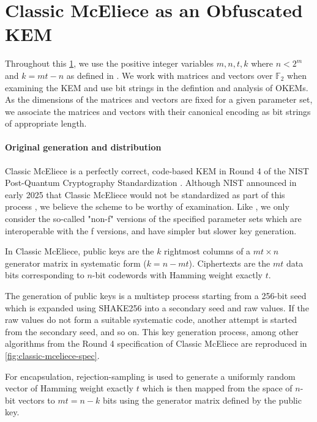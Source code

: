 \section{Classic McEliece as an Obfuscated KEM} \label{sec:obfuscating-classic-mceliece}

Throughout this \cref{sec:obfuscating-classic-mceliece}, we use the positive integer variables $m,n,t,k$ where $n < 2^m$ and $k=mt-n$ as defined in \cite{NISTPQC-R4:ClassicMcEliece22}. We work with matrices and vectors over $\mathbb F_2$ when examining the KEM and use bit strings in the defintion and analysis of OKEMs. As the dimensions of the matrices and vectors are fixed for a given parameter set, we associate the matrices and vectors with their canonical encoding as bit strings of appropriate length.

\paragraph{Original generation and distribution}
Classic McEliece \cite{NISTPQC-R4:ClassicMcEliece22} is a perfectly correct, code-based KEM in Round 4 of the NIST Post-Quantum Cryptography Standardization \cite{nist-standardization}. Although NIST announced in early 2025 that Classic McEliece would not be standardized as part of this process \cite{nist-ir-8545}, we believe the scheme to be worthy of examination. Like \cite{EC:Xagawa22}, we only consider the so-called "non-f" versions of the specified parameter sets which are interoperable with the f versions, and have simpler but slower key generation.
 
In Classic McEliece, public keys are the $k$ rightmost columns of a $mt \times n$ generator matrix in systematic form ($k = n - mt$). Ciphertexts are the $mt$ data bits corresponding to $n$-bit codewords with Hamming weight exactly $t$.

The generation of public keys is a multistep process starting from a 256-bit seed which is expanded using SHAKE256 into a secondary seed and raw values. If the raw values do not form a suitable systematic code, another attempt is started from the secondary seed, and so on. This key generation process, among other algorithms from the Round 4 specification of Classic McEliece are reproduced in \cref{fig:classic-mceliece-spec}.

For encapsulation, rejection-sampling is used to generate a uniformly random vector of Hamming weight exactly $t$ which is then mapped from the space of $n$-bit vectors to $mt=n-k$ bits using the generator matrix defined by the public key.

